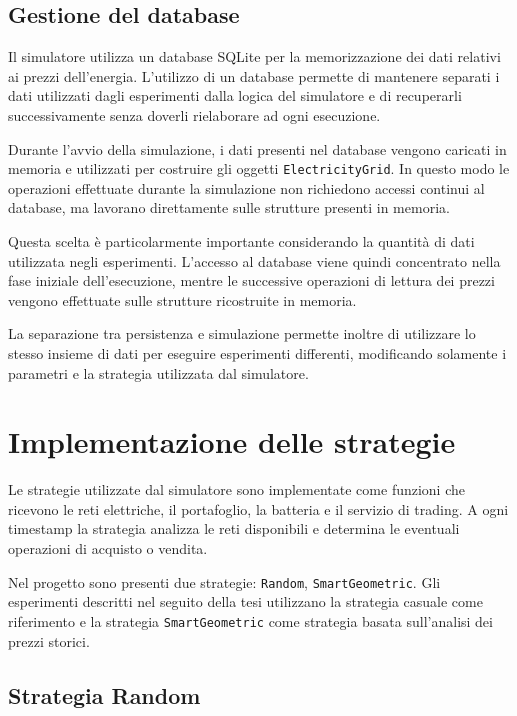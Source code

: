 \documentclass[a4paper,oneside,italian]{sapthesis}
\begin{document}
\subsection{Gestione del database}

Il simulatore utilizza un database SQLite per la memorizzazione dei dati
relativi ai prezzi dell'energia. L'utilizzo di un database permette di
mantenere separati i dati utilizzati dagli esperimenti dalla logica del
simulatore e di recuperarli successivamente senza doverli rielaborare ad
ogni esecuzione.

Durante l'avvio della simulazione, i dati presenti nel database vengono
caricati in memoria e utilizzati per costruire gli oggetti
\texttt{ElectricityGrid}. In questo modo le operazioni effettuate durante
la simulazione non richiedono accessi continui al database, ma lavorano
direttamente sulle strutture presenti in memoria.

Questa scelta è particolarmente importante considerando la quantità di dati
utilizzata negli esperimenti. L'accesso al database viene quindi
concentrato nella fase iniziale dell'esecuzione, mentre le successive
operazioni di lettura dei prezzi vengono effettuate sulle strutture
ricostruite in memoria.

La separazione tra persistenza e simulazione permette inoltre di utilizzare
lo stesso insieme di dati per eseguire esperimenti differenti, modificando
solamente i parametri e la strategia utilizzata dal simulatore.

\section{Implementazione delle strategie}

Le strategie utilizzate dal simulatore sono implementate come funzioni che
ricevono le reti elettriche, il portafoglio, la batteria e il servizio di
trading. A ogni timestamp la strategia analizza le reti disponibili e
determina le eventuali operazioni di acquisto o vendita.

Nel progetto sono presenti due strategie: \texttt{Random},
\texttt{SmartGeometric}. Gli esperimenti descritti
nel seguito della tesi utilizzano la strategia casuale come
riferimento e la strategia \texttt{SmartGeometric} come strategia basata
sull'analisi dei prezzi storici.

\subsection{Strategia Random}
\end{document}
